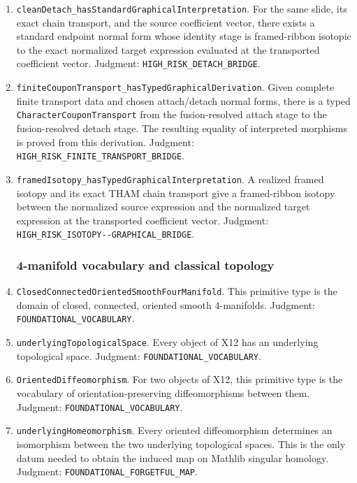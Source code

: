 \begin{enumerate}[label=\textbf{X\arabic*.},leftmargin=*]
\item \nolinkurl{cleanDetach_hasStandardGraphicalInterpretation}.
For the same slide, its exact chain transport, and the source coefficient
vector, there exists a standard endpoint normal form whose identity stage is
framed-ribbon isotopic to the exact normalized target expression evaluated at
the transported coefficient vector.  Judgment:
\nolinkurl{HIGH_RISK_DETACH_BRIDGE}.

\item \nolinkurl{finiteCouponTransport_hasTypedGraphicalDerivation}.
Given complete finite transport data and chosen attach/detach normal forms,
there is a typed \texttt{CharacterCouponTransport} from the fusion-resolved
attach stage to the fusion-resolved detach stage.  The resulting equality of
interpreted morphisms is proved from this derivation.  Judgment:
\nolinkurl{HIGH_RISK_FINITE_TRANSPORT_BRIDGE}.

\item \nolinkurl{framedIsotopy_hasTypedGraphicalInterpretation}.
A realized framed isotopy and its exact THAM chain transport give a
framed-ribbon isotopy between the normalized source expression and the
normalized target expression at the transported coefficient vector.
Judgment: \nolinkurl{HIGH_RISK_ISOTOPY--GRAPHICAL_BRIDGE}.

\subsubsection*{4-manifold vocabulary and classical topology}

\item \nolinkurl{ClosedConnectedOrientedSmoothFourManifold}.
This primitive type is the domain of closed, connected, oriented smooth
4-manifolds.  Judgment: \nolinkurl{FOUNDATIONAL_VOCABULARY}.

\item \texttt{underlyingTopologicalSpace}.
Every object of X12 has an underlying topological space.  Judgment:
\nolinkurl{FOUNDATIONAL_VOCABULARY}.

\item \texttt{OrientedDiffeomorphism}.
For two objects of X12, this primitive type is the vocabulary of
orientation-preserving diffeomorphisms between them.  Judgment:
\nolinkurl{FOUNDATIONAL_VOCABULARY}.

\item \texttt{underlyingHomeomorphism}.
Every oriented diffeomorphism determines an isomorphism between the two
underlying topological spaces.  This is the only datum needed to obtain the
induced map on Mathlib singular homology.  Judgment:
\nolinkurl{FOUNDATIONAL_FORGETFUL_MAP}.


\end{enumerate}
